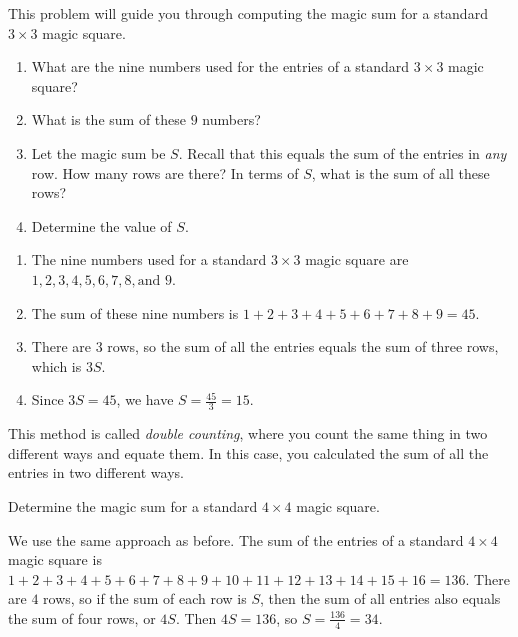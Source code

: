 \documentclass[11pt]{article}
\renewenvironment{problem}{\begin{problems}}{\end{problems}\vspace{5pt}}
\begin{document}
\begin{problem}[5=1+1+1+2 points]
This problem will guide you through computing the magic sum for a standard $3 \times 3$ magic square.

\begin{enumerate}[label=(\alph*)]
\item What are the nine numbers used for the entries of a standard $3 \times 3$ magic square?

\item What is the sum of these $9$ numbers?

\item Let the magic sum be $S$. Recall that this equals the sum of the entries in \textit{any} row. How many rows are there? 
In terms of $S$, what is the sum of all these rows?

\item Determine the value of $S$.
\end{enumerate}
\end{problem}

\begin{solution}
\begin{enumerate}[label=(\alph*)]
\item The nine numbers used for a standard $3 \times 3$ magic square are $\boxed{1,2,3,4,5,6,7,8, \text{and } 9}$.

\item The sum of these nine numbers is $1 + 2 + 3 + 4 + 5 + 6 + 7 + 8 + 9 = \boxed{45}$.

\item There are $3$ rows, so the sum of all the entries equals the sum of three rows, which is $\boxed{3S}$.

\item Since $3S = 45$, we have $S = \frac{45}{3} = \boxed{15}$.
\end{enumerate}
\end{solution}


This method is called \textit{double counting}, where you count the same thing in two different ways and equate them.
In this case, you calculated the sum of all the entries in two different ways.

\begin{problem}[3 points]
Determine the magic sum for a standard $4 \times 4$ magic square.
\end{problem}


\begin{solution}
We use the same approach as before. The sum of the entries of a standard $4 \times 4$ magic square is
$1+2+3+4+5+6+7+8+9+10+11+12+13+14+15+16 = 136$. There are $4$ rows, so if the sum of each row is $S$,
then the sum of all entries also equals the sum of four rows, or $4S$. Then $4S = 136$, so $S = \frac{136}{4} = \boxed{34}$.
\end{solution}
\end{document}
